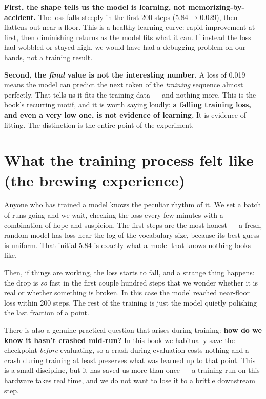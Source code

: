 \textbf{First, the shape tells us the model is learning, not
memorizing-by-accident.} The loss falls steeply in the first 200 steps
(5.84 → 0.029), then flattens out near a floor. This is a healthy
learning curve: rapid improvement at first, then diminishing returns as
the model fits what it can. If instead the loss had wobbled or stayed
high, we would have had a debugging problem on our hands, not a training
result.

\textbf{Second, the \emph{final} value is not the interesting number.} A
loss of 0.019 means the model can predict the next token of the
\emph{training} sequence almost perfectly. That tells us it fits the
training data --- and nothing more. This is the book's recurring motif,
and it is worth saying loudly: \textbf{a falling training loss, and even
a very low one, is not evidence of learning.} It is evidence of fitting.
The distinction is the entire point of the experiment.

\section{What the training process felt like (the brewing
experience)}\label{what-the-training-process-felt-like-the-brewing-experience}

Anyone who has trained a model knows the peculiar rhythm of it. We set a
batch of runs going and we wait, checking the loss every few minutes
with a combination of hope and suspicion. The first steps are the most
honest --- a fresh, random model has loss near the log of the vocabulary
size, because its best guess is uniform. That initial 5.84 is exactly
what a model that knows nothing looks like.

Then, if things are working, the loss starts to fall, and a strange
thing happens: the drop is \emph{so} fast in the first couple hundred
steps that we wonder whether it is real or whether something is broken.
In this case the model reached near-floor loss within 200 steps. The
rest of the training is just the model quietly polishing the last
fraction of a point.

There is also a genuine practical question that arises during training:
\textbf{how do we know it hasn't crashed mid-run?} In this book we
habitually save the checkpoint \emph{before} evaluating, so a crash
during evaluation costs nothing and a crash during training at least
preserves what was learned up to that point. This is a small discipline,
but it has saved us more than once --- a training run on this hardware
takes real time, and we do not want to lose it to a brittle downstream
step.

